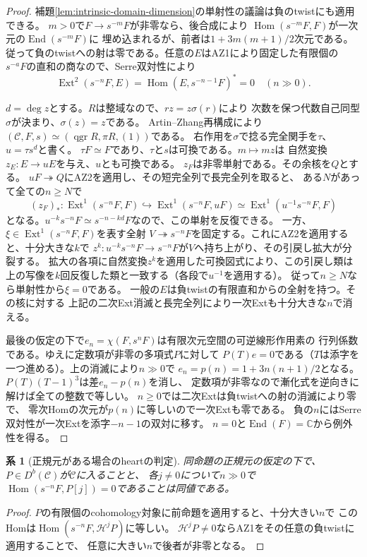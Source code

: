 \documentclass[11pt,a4paper]{ltjsarticle}
\newtheorem{corollary}[theorem]{系}
\theoremstyle{definition}
\newcommand{\qgr}{\operatorname{qgr}}
\begin{document}
\begin{proof}
補題\ref{lem:intrinsic-domain-dimension}の単射性の議論は負のtwistにも適用できる。
$m>0$で$F\to s^{-m}F$が非零なら、後合成により
$\operatorname{Hom}(s^{-m}F,F)$が一次元の$\operatorname{End}(s^{-m}F)$に
埋め込まれるが、前者は$1+3m(m+1)/2$次元である。
従って負のtwistへの射は零である。任意の$E$はAZ1により固定した有限個の
$s^{-a}F$の直和の商なので、Serre双対性により
\[
 \operatorname{Ext}^2(s^{-n}F,E)
       =\operatorname{Hom}(E,s^{-n-1}F)^*=0\quad(n\gg0).
\]

$d=\deg z$とする。$R$は整域なので、$rz=z\sigma(r)$により
次数を保つ代数自己同型$\sigma$が決まり、$\sigma(z)=z$である。
Artin--Zhang再構成により$(\mathcal C,F,s)\simeq(\qgr R,\pi R,(1))$である。
右作用を$\sigma$で捻る完全関手を$\tau$、$u=\tau s^d$と書く。
$\tau F\simeq F$であり、$\tau$と$s$は可換である。$m\mapsto mz$は
自然変換$z_E:E\to uE$を与え、$u$とも可換である。
$z_F$は非零単射である。その余核を$Q$とする。
$uF\twoheadrightarrow Q$にAZ2を適用し、その短完全列で長完全列を取ると、
ある$N$があって全ての$n\ge N$で
\[
 (z_F)_*: \operatorname{Ext}^1(s^{-n}F,F)
      \hookrightarrow\operatorname{Ext}^1(s^{-n}F,uF)
       \simeq\operatorname{Ext}^1(u^{-1}s^{-n}F,F)
\]
となる。$u^{-k}s^{-n}F\simeq s^{-n-kd}F$なので、この単射を反復できる。
一方、$\xi\in\operatorname{Ext}^1(s^{-n}F,F)$を表す全射
$V\twoheadrightarrow s^{-n}F$を固定する。これにAZ2を適用すると、十分大きな$k$で
$z^k:u^{-k}s^{-n}F\to s^{-n}F$が$V$へ持ち上がり、その引戻し拡大が分裂する。
拡大の各項に自然変換$z^k$を適用した可換図式により、この引戻し類は
上の写像を$k$回反復した類と一致する（各段で$u^{-1}$を適用する）。
従って$n\ge N$なら単射性から$\xi=0$である。
一般の$E$は負twistの有限直和からの全射を持つ。その核に対する
上記の二次Ext消滅と長完全列により一次Extも十分大きな$n$で消える。

最後の仮定の下で$e_n=\chi(F,s^nF)$は有限次元空間の可逆線形作用素の
行列係数である。ゆえに定数項が非零の多項式$P$に対して
$P(T)e=0$である（$T$は添字を一つ進める）。上の消滅により$n\gg0$で
$e_n=p(n)=1+3n(n+1)/2$となる。$P(T)(T-1)^3$は差$e_n-p(n)$を消し、
定数項が非零なので漸化式を逆向きに解けば全ての整数で等しい。
$n\ge0$では二次Extは負twistへの射の消滅により零で、
零次Homの次元が$p(n)$に等しいので一次Extも零である。
負の$n$にはSerre双対性が一次Extを添字$-n-1$の双対に移す。
$n=0$と$\operatorname{End}(F)=\mathbb C$から例外性を得る。
\end{proof}

\begin{corollary}[正規元がある場合のheartの判定]
同命題の正規元の仮定の下で、$P\in D^b(\mathcal C)$が$\mathcal C$に入ることと、
各$j\ne0$について$n\gg0$で$\operatorname{Hom}(s^{-n}F,P[j])=0$であることは同値である。
\end{corollary}
\begin{proof}
$P$の有限個のcohomology対象に前命題を適用すると、十分大きい$n$で
このHomは$\operatorname{Hom}(s^{-n}F,\mathcal H^jP)$に等しい。
$\mathcal H^jP\ne0$ならAZ1をその任意の負twistに適用することで、
任意に大きい$n$で後者が非零となる。
\end{proof}
\end{document}
